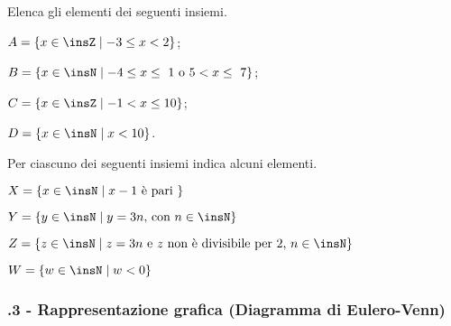 \begin{esercizio}
\label{ese:6.17}
Elenca gli elementi dei seguenti insiemi.
\begin{multicols}{2}
\begin{enumeratea}
\item $A=\{x\in\insZ\mid -3\le x<2\}$;
\item $B=\{x\in\insN\mid -4\le x\le~1\text{ o }5<x\le~7\}$;
\item $C=\{x\in\insZ\mid -1< x\le 10\}$;
\item $D=\{x\in\insN\mid x<10\}$.
\end{enumeratea}
\end{multicols}
\end{esercizio}

\begin{esercizio}
\label{ese:6.18}
Per ciascuno dei seguenti insiemi indica alcuni elementi.
\TabPositions{6cm}
\begin{enumeratea}
\item $X=\{x\in\insN\mid x-1\text{ è pari }\}$\dotfill
\item $Y=\{y\in\insN\mid y=3n\text{, con } n\in\insN\}$\dotfill
\item $Z=\{z\in\insN\mid z=3n\text{ e } z\text{ non è divisibile per~2, }n\in\insN\}$\dotfill
\item $W=\{w\in\insN\mid w<0\}$\dotfill
\end{enumeratea}
\end{esercizio}

\subsubsection*{\thechapter.3 - Rappresentazione grafica (Diagramma di Eulero-Venn)}

